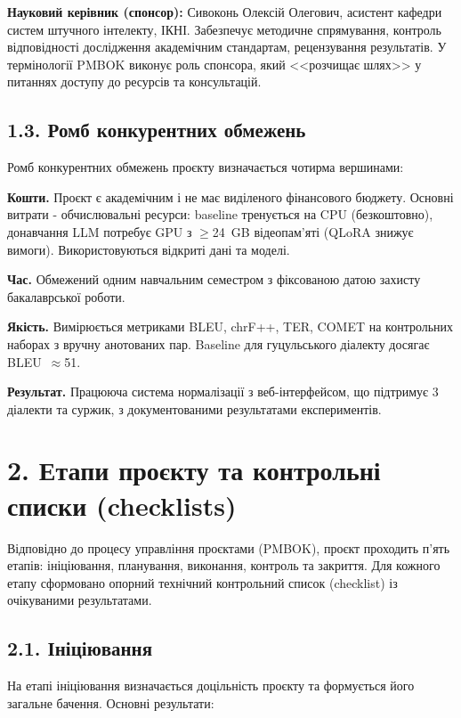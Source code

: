 \documentclass[14pt]{extarticle}
\begin{document}
\textbf{Науковий керівник (спонсор):} Сивоконь Олексій Олегович, асистент кафедри систем штучного інтелекту, ІКНІ. Забезпечує методичне спрямування, контроль відповідності дослідження академічним стандартам, рецензування результатів. У термінології PMBOK виконує роль спонсора, який <<розчищає шлях>> у питаннях доступу до ресурсів та консультацій.

\subsection*{1.3. Ромб конкурентних обмежень}

Ромб конкурентних обмежень проєкту визначається чотирма вершинами:

\textbf{Кошти.} Проєкт є академічним і не має виділеного фінансового бюджету. Основні витрати - обчислювальні ресурси: baseline тренується на CPU (безкоштовно), донавчання LLM потребує GPU з $\geq$24~GB відеопам'яті (QLoRA знижує вимоги). Використовуються відкриті дані та моделі.

\textbf{Час.} Обмежений одним навчальним семестром з фіксованою датою захисту бакалаврської роботи.

\textbf{Якість.} Вимірюється метриками BLEU, chrF++, TER, COMET на контрольних наборах з вручну анотованих пар. Baseline для гуцульського діалекту досягає BLEU~$\approx$51.

\textbf{Результат.} Працююча система нормалізації з веб-інтерфейсом, що підтримує 3 діалекти та суржик, з документованими результатами експериментів.

\section*{2. Етапи проєкту та контрольні списки (checklists)}

Відповідно до процесу управління проєктами (PMBOK), проєкт проходить п'ять етапів: ініціювання, планування, виконання, контроль та закриття. Для кожного етапу сформовано опорний технічний контрольний список (checklist) із очікуваними результатами.

\subsection*{2.1. Ініціювання}

На етапі ініціювання визначається доцільність проєкту та формується його загальне бачення. Основні результати:
\end{document}
